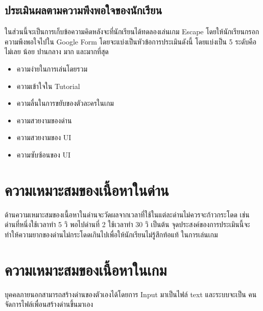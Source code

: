 \subsection{ประเมินผลตามความพึงพอใจของนักเรียน}
ในส่วนนี้จะเป็นการเก็บข้อความคิดหลังจะที่นักเรียนได้ทดลองเล่นเกม Escape โดยให้นักเรียนกรอกความพึงพอใจไปใน
Google Form โดยจะแบ่งเป็นหัวข้อการประเมินดังนี้ โดยแบ่งเป็น 5 ระดับคือ ไม่เลย น้อย ปานกลาง มาก และมากที่สุด
\begin{itemize}
    \item ความง่ายในการเล่นโดยรวม
    \item ความเข้าใจใน Tutorial
    \item ความลื่นในการขยับของตัวละครในเกม
    \item ความสวยงามของด่าน
    \item ความสวยงามของ UI
    \item ความซับซ้อนของ UI
\end{itemize}
\section{ความเหมาะสมของเนื้อหาในด่าน}
ด้านความเหมาะสมของเนื้อหาในด่านจะวัดผลจากเวลาที่ใช้ในแต่ละด่านไม่ควรจะก้าวกระโดด
เช่น ด่านที่หนึ่งใช้เวลาทำ 5 วิ พอไปด่านที่ 2 ใช้เวลาทำ 30 วิ เป็นต้น
จุดประสงค์ของการประเมินนี้จะทำให้ความยากของด่านไม่กระโดดเกินไปเพื่อให้นักเรียนไม่รู้สึกท้อแท้
ในการเล่นเกม
\section{ความเหมาะสมของเนื้อหาในเกม}
บุคคลภายนอกสามารถสร้างด่านของตัวเองได้โดยการ Input มาเป็นไฟล์ text และระบบจะเป็น
คนจัดการไฟล์เพื่อนสร้างด่านขึ้นมาเอง


